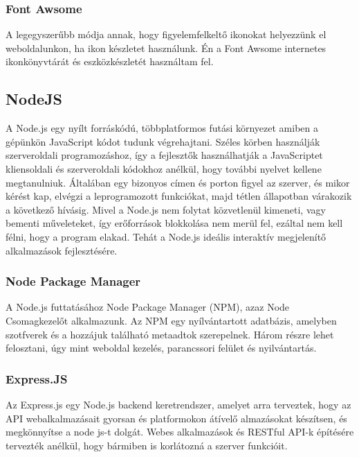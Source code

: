 \subsubsection{Font Awsome}

A legegyszerűbb módja annak, hogy figyelemfelkeltő ikonokat helyezzünk el weboldalunkon, ha ikon készletet használunk. Én a Font Awsome internetes ikonkönyvtárát és eszközkészletét használtam fel.

\subsection{NodeJS }

A Node.js egy nyílt forráskódú, többplatformos futási környezet amiben a gépünkön JavaScript kódot tudunk végrehajtani. Széles körben használják szerveroldali programozáshoz, így a fejlesztők használhatják a JavaScriptet kliensoldali és szerveroldali kódokhoz anélkül, hogy további nyelvet kellene megtanulniuk. Általában egy bizonyos címen és porton figyel az szerver, és mikor kérést kap, elvégzi a leprogramozott funkciókat, majd tétlen állapotban várakozik a következő hívásig. Mivel a Node.js nem folytat közvetlenül kimeneti, vagy bementi műveleteket, így erőforrások blokkolása nem merül fel, ezáltal nem kell félni, hogy a program elakad. Tehát a Node.js ideális interaktív megjelenítő alkalmazások fejlesztésére. \cite{nodeJS}

\subsubsection{Node Package Manager}

A Node.js futtatásához Node Package Manager (NPM), azaz Node Csomagkezelőt alkalmazunk. Az NPM egy nyílvántartott adatbázis, amelyben szotfverek és a hozzájuk található metaadtok szerepelnek. Három részre lehet felosztani, úgy mint weboldal kezelés, parancssori felület és nyilvántartás.

\subsubsection{Express.JS}

Az Express.js egy Node.js backend keretrendszer, amelyet arra terveztek, hogy az API webalkalmazásait gyorsan és platformokon átívelő almazásokat készítsen, és megkönnyítse a node js-t dolgát. Webes alkalmazások és RESTful API-k építésére tervezték anélkül, hogy bármiben is korlátozná a szerver funkcióit.

